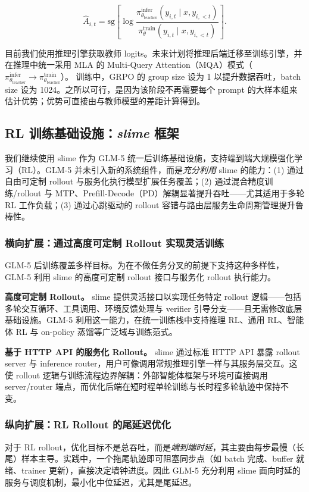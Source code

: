 \begin{equation}
    \hat{A}_{i,t} = \text{sg}\left[\log\frac{\pi_{\theta_{\text{teacher}}}^{\text{infer}}(y_{i,t}\mid x,y_{i,<t})}{\pi_\theta^{\text{train}}(y_{i,t}\mid x,y_{i,<t})}\right].
\end{equation}

目前我们使用推理引擎获取教师 logits。未来计划将推理后端迁移至训练引擎，并在推理中统一采用 MLA 的 Multi-Query Attention（MQA）模式（$\pi_{\theta_{\text{teacher}}}^{\text{infer}}\rightarrow\pi_{\theta_{\text{teacher}}}^{\text{train}}$）。
训练中，GRPO 的 group size 设为 1 以提升数据吞吐，batch size 设为 1024。之所以可行，是因为该阶段不再需要每个 prompt 的大样本组来估计优势；优势可直接由与教师模型的差距计算得到。

\subsection{RL 训练基础设施：\emph{slime} 框架}

我们继续使用 slime 作为 GLM-5 统一后训练基础设施，支持端到端大规模强化学习（RL）。GLM-5 并未引入新的系统组件，而是\emph{充分利用} slime 的能力：(1) 通过自由可定制 rollout 与服务化执行模型扩展任务覆盖；(2) 通过混合精度训练/rollout 与 MTP、Prefill-Decode（PD）解耦显著提升吞吐——尤其适用于多轮 RL 工作负载；(3) 通过心跳驱动的 rollout 容错与路由层服务生命周期管理提升鲁棒性。

\subsubsection{横向扩展：通过高度可定制 Rollout 实现灵活训练}
GLM-5 后训练覆盖多样目标。为在不做任务分叉的前提下支持这种多样性，GLM-5 利用 slime 的高度可定制 rollout 接口与服务化 rollout 执行能力。

\textbf{高度可定制 Rollout。} slime 提供灵活接口以实现任务特定 rollout 逻辑——包括多轮交互循环、工具调用、环境反馈处理与 verifier 引导分支——且无需修改底层基础设施。GLM-5 利用这一能力，在统一训练栈中支持推理 RL、通用 RL、智能体 RL 与 on-policy 蒸馏等广泛域与训练范式。

\textbf{基于 HTTP API 的服务化 Rollout。} slime 通过标准 HTTP API 暴露 rollout server 与 inference router，用户可像调用常规推理引擎一样与其服务层交互。这使 rollout 逻辑与训练流程边界解耦：外部智能体框架与环境可直接调用 server/router 端点，而优化后端在短时程单轮训练与长时程多轮轨迹中保持不变。

\subsubsection{纵向扩展：RL Rollout 的尾延迟优化}
对于 RL rollout，优化目标不是总吞吐，而是\emph{端到端时延}，其主要由每步最慢（长尾）样本主导。实践中，一个拖尾轨迹即可阻塞同步点（如 batch 完成、buffer 就绪、trainer 更新），直接决定墙钟进度。因此 GLM-5 充分利用 slime 面向时延的服务与调度机制，最小化中位延迟，尤其是尾延迟。

